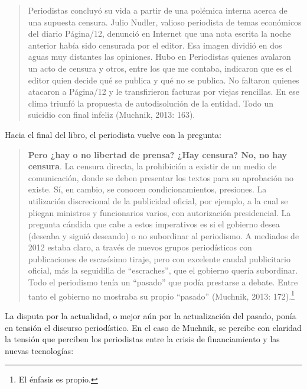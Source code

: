 \begin{quote}
Periodistas concluyó su vida a partir de una polémica interna acerca de una supuesta censura. Julio Nudler, valioso periodista de temas económicos del diario Página/12, denunció en Internet que una nota escrita la noche anterior había sido censurada por el editor. Esa imagen dividió en dos aguas muy distantes las opiniones. Hubo en Periodistas quienes avalaron un acto de censura y otros, entre los que me contaba, indicaron que es el editor quien decide qué se publica y qué no se publica. No faltaron quienes atacaron a Página/12 y le transfirieron facturas por viejas rencillas. En ese clima triunfó la propuesta de autodisolución de la entidad. Todo un suicidio con final infeliz (Muchnik, 2013: 163).
\end{quote}

Hacia el final del libro, el periodista vuelve con la pregunta:

\begin{quote}
\textbf{Pero ¿hay o no libertad de prensa? ¿Hay censura? No, no hay censura}. La censura directa, la prohibición a existir de un medio de comunicación, donde se deben presentar los textos para su aprobación no existe. Sí, en cambio, se conocen condicionamientos, presiones. La utilización discrecional de la publicidad oficial, por ejemplo, a la cual se pliegan ministros y funcionarios varios, con autorización presidencial. La pregunta cándida que cabe a estos imperativos es si el gobierno desea (deseaba y siguió deseando) o no subordinar al periodismo. A mediados de 2012 estaba claro, a través de nuevos grupos periodísticos con publicaciones de escasísimo tiraje, pero con excelente caudal publicitario oficial, más la seguidilla de \enquote{escraches}, que el gobierno quería subordinar. Todo el periodismo tenía un \enquote{pasado} que podía prestarse a debate. Entre tanto el gobierno no mostraba su propio \enquote{pasado} (Muchnik, 2013: 172).\footnote{El énfasis es propio.}
\end{quote}

La disputa por la actualidad, o mejor aún por la actualización del pasado, ponía en tensión el discurso periodístico. En el caso de Muchnik, se percibe con claridad la tensión que perciben los periodistas entre la crisis de financiamiento y las nuevas tecnologías:

